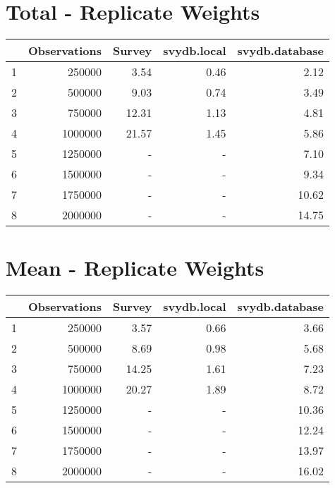 \section{Total - Replicate Weights}
\begin{table}[ht]
\centering
\begin{tabular}{rrrrr}
  \hline
 & Observations & Survey & svydb.local & svydb.database \\ 
  \hline
1 & 250000 & 3.54 & 0.46 & 2.12 \\ 
  2 & 500000 & 9.03 & 0.74 & 3.49 \\ 
  3 & 750000 & 12.31 & 1.13 & 4.81 \\ 
  4 & 1000000 & 21.57 & 1.45 & 5.86 \\ 
  5 & 1250000 & - & - & 7.10 \\ 
  6 & 1500000 & - & - & 9.34 \\ 
  7 & 1750000 & - & - & 10.62 \\ 
  8 & 2000000 & - & - & 14.75 \\ 
  \hline
\end{tabular}
\end{table}


\section{Mean - Replicate Weights}
\begin{table}[ht]
\centering
\begin{tabular}{rrrrr}
  \hline
 & Observations & Survey & svydb.local & svydb.database \\ 
  \hline
1 & 250000 & 3.57 & 0.66 & 3.66 \\ 
  2 & 500000 & 8.69 & 0.98 & 5.68 \\ 
  3 & 750000 & 14.25 & 1.61 & 7.23 \\ 
  4 & 1000000 & 20.27 & 1.89 & 8.72 \\ 
  5 & 1250000 & - & - & 10.36 \\ 
  6 & 1500000 & - & - & 12.24 \\ 
  7 & 1750000 & - & - & 13.97 \\ 
  8 & 2000000 & - & - & 16.02 \\ 
  \hline
\end{tabular}
\end{table}

\newpage


